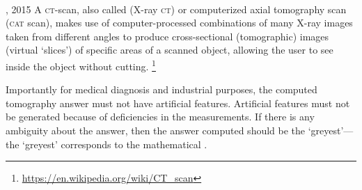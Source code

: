 
\begin{example} \label{eg:ctscan}
\ 
\begin{quoted}{, 2015}
A \textsc{ct}-scan, also called     (X-ray \textsc{ct}) or computerized axial {tomography} scan (\textsc{cat} scan), makes use of computer-processed combinations of many X-ray images taken from different angles to produce cross-sectional (tomographic) images (virtual `slices') of specific areas of a scanned object, allowing the user to see inside the object without cutting.%
\footnote{\protect\url{https://en.wikipedia.org/wiki/CT\_scan}}
\end{quoted}
Importantly for medical diagnosis and industrial purposes, the computed tomography answer must not have artificial features.
Artificial features must not be generated because of deficiencies in the measurements.
If there is any ambiguity about the answer, then the answer computed should be the `greyest'---the `greyest' corresponds to the mathematical .


\end{example}
